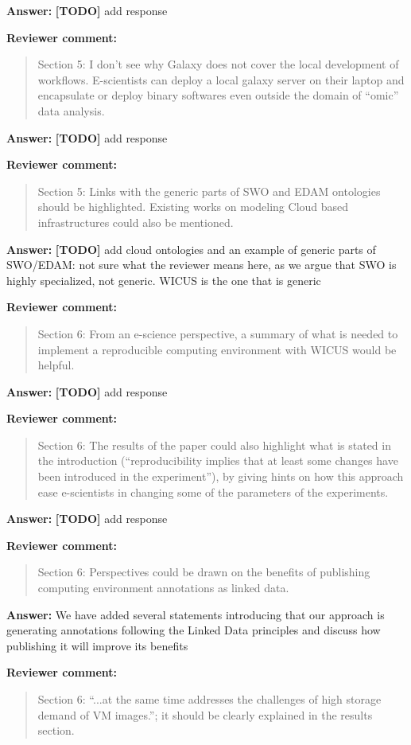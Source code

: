 \documentclass{letter}
\newenvironment{review}%
{\textbf{Reviewer comment:}\begin{quote}}%
{\end{quote}}%
\newcommand{\todo}[1]{%
      \color{red}\textbf{[TODO]} #1\color{black}}
\newcommand{\answer}[1]{%
      \textbf{Answer:} #1}
\begin{document}
\begin{letter}{}
\answer{\todo{add response}}


\begin{review}
Section 5: I don't see why Galaxy does not cover the local development of workflows. E-scientists can deploy a local galaxy server on their laptop and encapsulate or deploy binary softwares even outside the domain of ``omic'' data analysis.
\end{review}

\answer{\todo{add response}}


\begin{review}
Section 5: Links with the generic parts of SWO and EDAM ontologies should be highlighted. Existing works on modeling Cloud based infrastructures could also be mentioned.
\end{review}

\answer{\todo{add cloud ontologies and an example of generic parts of SWO/EDAM: not sure what the reviewer means here, as we argue that SWO is highly specialized, not generic. WICUS is the one that is generic}}


\begin{review}
Section 6: From an e-science perspective, a summary of what is needed to implement a reproducible computing environment with WICUS would be helpful.
\end{review}

\answer{\todo{add response}}


\begin{review}
Section 6: The results of the paper could also highlight what is stated in the introduction (``reproducibility implies that at least some changes have been introduced in the experiment''), by giving hints on how this approach ease e-scientists in changing some of the parameters of the experiments.
\end{review}

\answer{\todo{add response}}


\begin{review}
Section 6: Perspectives could be drawn on the benefits of publishing computing environment annotations as linked data.
\end{review}

\answer{We have added several statements introducing that our approach is generating annotations following the Linked Data principles and discuss how publishing it will improve its benefits}

\begin{review}
Section 6: ``...at the same time addresses the challenges of high storage demand of VM images.''; it should be clearly explained in the results section.
\end{review}


\end{letter}
\end{document}
